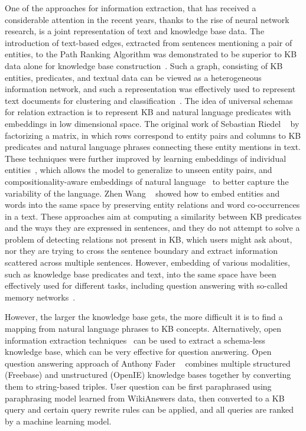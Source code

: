 One of the approaches for information extraction, that has received a considerable attention in the recent years, thanks to the rise of neural network research, is a joint representation of text and knowledge base data.
The introduction of text-based edges, extracted from sentences mentioning a pair of entities, to the Path Ranking Algorithm was demonstrated to be superior to KB data alone for knowledge base construction~\cite{lao2012reading}.
Such a graph, consisting of KB entities, predicates, and textual data can be viewed as a heterogeneous information network, and such a representation was effectively used to represent text documents for clustering and classification~\cite{wang2015incorporating,wang2016text}.
The idea of universal schemas for relation extraction is to represent KB and natural language predicates with embeddings in low dimensional space.
The original work of Sebastian Riedel \etal~\cite{riedel2013relation} by factorizing a matrix, in which rows correspond to entity pairs and columns to KB predicates and natural language phrases connecting these entity mentions in text.
These techniques were further improved by learning embeddings of individual entities~\cite{verga2016row}, which allows the model to generalize to unseen entity pairs, and compositionality-aware embeddings of natural language~\cite{toutanova2015representing} to better capture the variability of the language.
Zhen Wang \etal~\cite{wang2014knowledge} showed how to embed entities and words into the same space by preserving entity relations and word co-occurrences in a text.
These approaches aim at computing a similarity between KB predicates and the ways they are expressed in sentences, and they do not attempt to solve a problem of detecting relations not present in KB, which users might ask about, nor they are trying to cross the sentence boundary and extract information scattered across multiple sentences.
However, embedding of various modalities, such as knowledge base predicates and text, into the same space have been effectively used for different tasks, including question answering with so-called memory networks~\cite{bordes2015large,miller2016key}.

However, the larger the knowledge base gets, the more difficult it is to find a mapping from natural language phrases to KB concepts.
Alternatively, open information extraction techniques~\cite{Etzioni:2008:OIE:1409360.1409378} can be used to extract a schema-less knowledge base, which can be very effective for question answering.
Open question answering approach of Anthony Fader \etal~\cite{Fader:2014:OQA:2623330.2623677,yin2015answering} combines multiple structured (Freebase) and unstructured (OpenIE) knowledge bases together by converting them to string-based triples.
User question can be first paraphrased using paraphrasing model learned from WikiAnswers data, then converted to a KB query and certain query rewrite rules can be applied, and all queries are ranked by a machine learning model.


